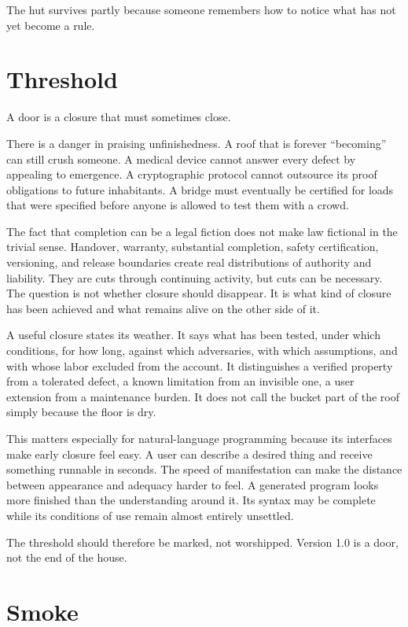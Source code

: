 \documentclass[11pt]{article}
\begin{document}
The hut survives partly because someone remembers how to notice what has not yet become a rule.

\section*{Threshold}

A door is a closure that must sometimes close.

There is a danger in praising unfinishedness. A roof that is forever ``becoming'' can still crush someone. A medical device cannot answer every defect by appealing to emergence. A cryptographic protocol cannot outsource its proof obligations to future inhabitants. A bridge must eventually be certified for loads that were specified before anyone is allowed to test them with a crowd.

The fact that completion can be a legal fiction does not make law fictional in the trivial sense. Handover, warranty, substantial completion, safety certification, versioning, and release boundaries create real distributions of authority and liability. They are cuts through continuing activity, but cuts can be necessary. The question is not whether closure should disappear. It is what kind of closure has been achieved and what remains alive on the other side of it.

A useful closure states its weather. It says what has been tested, under which conditions, for how long, against which adversaries, with which assumptions, and with whose labor excluded from the account. It distinguishes a verified property from a tolerated defect, a known limitation from an invisible one, a user extension from a maintenance burden. It does not call the bucket part of the roof simply because the floor is dry.

This matters especially for natural-language programming because its interfaces make early closure feel easy. A user can describe a desired thing and receive something runnable in seconds. The speed of manifestation can make the distance between appearance and adequacy harder to feel. A generated program looks more finished than the understanding around it. Its syntax may be complete while its conditions of use remain almost entirely unsettled.

The threshold should therefore be marked, not worshipped. Version 1.0 is a door, not the end of the house.

\section*{Smoke}
\end{document}
